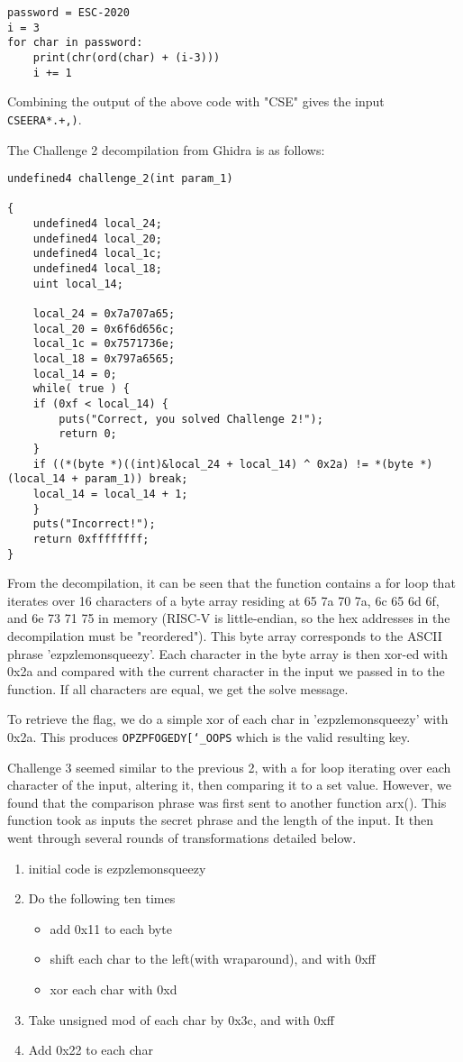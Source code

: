 \begin{lstlisting}
password = ESC-2020
i = 3
for char in password:
	print(chr(ord(char) + (i-3)))
	i += 1
\end{lstlisting}

Combining the output of the above code with "CSE" gives the input \texttt{CSEERA*.+,)}.

The Challenge 2 decompilation from Ghidra is as follows:

\begin{lstlisting}
undefined4 challenge_2(int param_1)

{
	undefined4 local_24;
	undefined4 local_20;
	undefined4 local_1c;
	undefined4 local_18;
	uint local_14;
	
	local_24 = 0x7a707a65;
	local_20 = 0x6f6d656c;
	local_1c = 0x7571736e;
	local_18 = 0x797a6565;
	local_14 = 0;
	while( true ) {
	if (0xf < local_14) {
		puts("Correct, you solved Challenge 2!");
		return 0;
	}
	if ((*(byte *)((int)&local_24 + local_14) ^ 0x2a) != *(byte *)(local_14 + param_1)) break;
	local_14 = local_14 + 1;
	}
	puts("Incorrect!");
	return 0xffffffff;
}
\end{lstlisting}

From the decompilation, it can be seen that the function contains a for loop that iterates over 16 characters of a byte array residing at 65 7a 70 7a, 6c 65 6d 6f, and 6e 73 71 75 in memory (RISC-V is little-endian, so the hex addresses in the decompilation must be "reordered"). This byte array corresponds to the ASCII phrase 'ezpzlemonsqueezy'. Each character in the byte array is then xor-ed with 0x2a and compared with the current character in the input we passed in to the function. If all characters are equal, we get the solve message.

To retrieve the flag, we do a simple xor of each char in 'ezpzlemonsqueezy' with 0x2a. This produces \texttt{OPZPFOGEDY[\char`_OOPS} which is the valid resulting key.

Challenge 3 seemed similar to the previous 2, with a for loop iterating over each character of the input, altering it, then comparing it to a set value. However, we found that the comparison phrase was first sent to another function arx(). This function took as inputs the secret phrase and the length of the input. It then went through several rounds of transformations detailed below.

\begin{enumerate}
\item initial code is ezpzlemonsqueezy
\item Do the following ten times
	\begin{itemize}
	\item add 0x11 to each byte
	\item shift each char to the left(with wraparound), and with 0xff
	\item xor each char with 0xd
	\end{itemize}
\item Take unsigned mod of each char by 0x3c, and with 0xff
\item Add 0x22 to each char
\end{enumerate}

